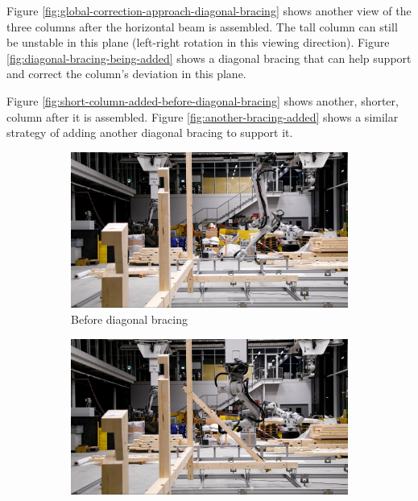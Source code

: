 Figure \ref{fig:global-correction-approach-diagonal-bracing} shows another view of the three columns after the horizontal beam is assembled. The tall column can still be unstable in this plane (left-right rotation in this viewing direction). Figure \ref{fig:diagonal-bracing-being-added} shows a diagonal bracing that can help support and correct the column’s deviation in this plane.

Figure \ref{fig:short-column-added-before-diagonal-bracing} shows another, shorter, column after it is assembled. Figure \ref{fig:another-bracing-added} shows a similar strategy of adding another diagonal bracing to support it.

\begin{figure}[!h]
    \centering
    \begin{subfigure}[b]{0.49\textwidth}
        \centering
        \includegraphics[width=\textwidth]{images/7b/img47.jpg}
        \caption{Before diagonal bracing}
    \end{subfigure}
    \hfill
    \begin{subfigure}[b]{0.49\textwidth}
        \centering
        \includegraphics[width=\textwidth]{images/7b/img48.jpg}

\end{subfigure}
\end{figure}
